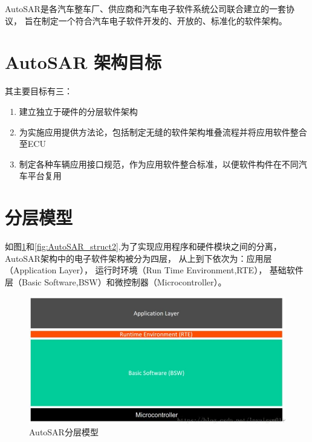 AutoSAR是各汽车整车厂、供应商和汽车电子软件系统公司联合建立的一套协议，
旨在制定一个符合汽车电子软件开发的、开放的、标准化的软件架构。

\section{AutoSAR 架构目标}

其主要目标有三：

\begin{enumerate}
	\item 建立独立于硬件的分层软件架构
	\item 为实施应用提供方法论，包括制定无缝的软件架构堆叠流程并将应用软件整合至ECU
	\item 制定各种车辆应用接口规范，作为应用软件整合标准，以便软件构件在不同汽车平台复用
\end{enumerate}

\section{分层模型}
如图\ref{fig:AutoSAR_struct}和\ref{fig:AutoSAR_struct2},为了实现应用程序和硬件模块之间的分离，AutoSAR架构中的电子软件架构被分为四层，
从上到下依次为：应用层（Application Layer），
运行时环境（Run Time Environment,RTE），
基础软件层（Basic Software,BSW）和微控制器（Microcontroller）。

\begin{figure}[ht]
	\centering
	\includegraphics[scale=0.5]{./pic/autosar_struct.jpg}
	\caption{AutoSAR分层模型}
	\label{fig:AutoSAR_struct}
\end{figure}

